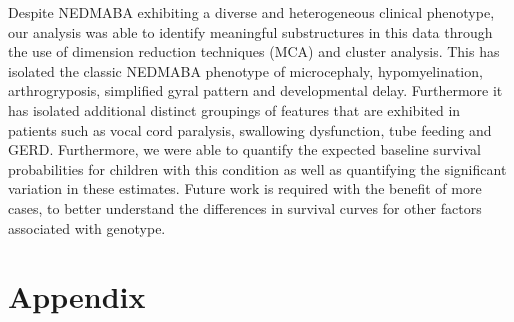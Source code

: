 \documentclass[
  letterpaper,
  DIV=11,
  numbers=noendperiod]{scrartcl}
\begin{document}
Despite NEDMABA exhibiting a diverse and heterogeneous clinical
phenotype, our analysis was able to identify meaningful substructures in
this data through the use of dimension reduction techniques (MCA) and
cluster analysis. This has isolated the classic NEDMABA phenotype of
microcephaly, hypomyelination, arthrogryposis, simplified gyral pattern
and developmental delay. Furthermore it has isolated additional distinct
groupings of features that are exhibited in patients such as vocal cord
paralysis, swallowing dysfunction, tube feeding and GERD. Furthermore,
we were able to quantify the expected baseline survival probabilities
for children with this condition as well as quantifying the significant
variation in these estimates. Future work is required with the benefit
of more cases, to better understand the differences in survival curves
for other factors associated with genotype.

\newpage

\hypertarget{appendix}{%
\section{Appendix}\label{appendix}}
\end{document}

